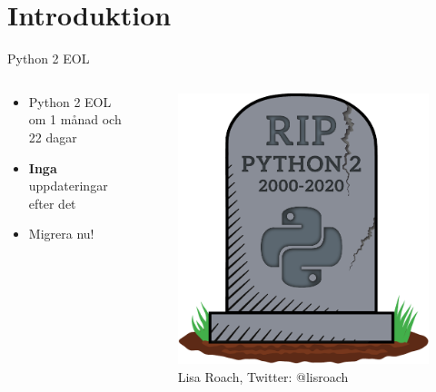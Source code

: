{
\section*{Introduktion}
}

\begin{frame}{Python 2 EOL}
  \begin{columns}
    \begin{column}{0.7\linewidth}
      \begin{itemize}
        \item Python 2 EOL om 1 månad och 22 dagar
        \item \textbf{Inga} uppdateringar efter det
        \item Migrera nu!
      \end{itemize}
    \end{column}
    \begin{column}{0.3\linewidth}
      \begin{figure}
        \includegraphics[width=\linewidth,keepaspectratio]{fig/python2eol}
        \caption{Lisa Roach, Twitter: @lisroach}
      \end{figure}
    \end{column}
  \end{columns}
\end{frame}


